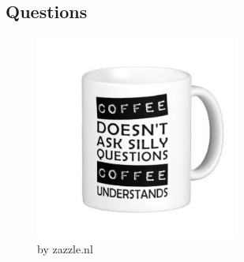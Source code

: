 \subsection{Questions}

    \begin{figure}[ht!]
        \centering
        \includegraphics[width=0.6\textwidth]{./media/coffee_understands}
        \caption{by zazzle.nl}
        \label{fig:goal-design}
    \end{figure}
